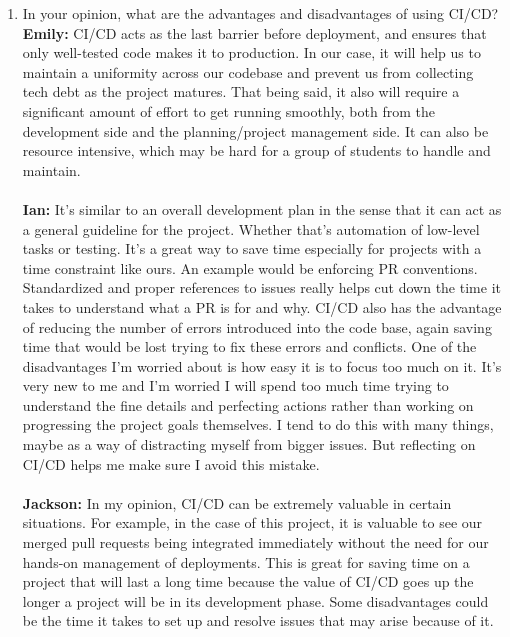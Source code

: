 \documentclass{article}
\begin{document}
\begin{enumerate}
    \item In your opinion, what are the advantages and disadvantages of using
    CI/CD?\\
    \textbf{Emily:} CI/CD acts as the last barrier before deployment, and ensures that only well-tested code makes it to production. In our case, it will help 
                    us to maintain a uniformity across our codebase and prevent us from collecting tech debt as the project matures. That being said, it also will 
                    require a significant amount of effort to get running smoothly, both from the development side and the planning/project management side. It 
                    can also be resource intensive, which may be hard for a group of students to handle and maintain.  \\ \\
    \textbf{Ian:}  It's similar to an overall development plan in the sense that it can act as a general guideline for the project. Whether that's automation of low-level tasks
                    or testing. It's a great way to save time especially for projects with a time constraint like ours. An example would be enforcing PR conventions. Standardized and proper 
                    references to issues really helps cut down the time it takes to understand what a PR is for and why. CI/CD also has the advantage of reducing the number of errors introduced 
                    into the code base, again saving time that would be lost trying to fix these errors and conflicts. One of the disadvantages I'm worried about is how easy it is to focus too much 
                    on it. It's very new to me and I'm worried I will spend too much time trying to understand the fine details and perfecting actions rather than working on progressing the project 
                    goals themselves. I tend to do this with many things, maybe as a way of distracting myself from bigger issues. But reflecting on CI/CD helps me make sure I avoid this mistake.\\ \\
    \textbf{Jackson:} In my opinion, CI/CD can be extremely valuable in certain situations. For example, in the case of this project, it is valuable to see our merged pull requests 
                      being integrated immediately without the need for our hands-on management of deployments. This is great for saving time on a project that will last a long time because the value 
                      of CI/CD goes up the longer a project will be in its development phase. Some disadvantages could be the time it takes to set up and resolve issues that may arise because of it. 

\end{enumerate}
\end{document}

